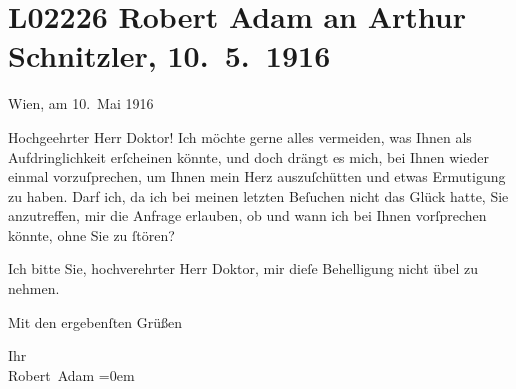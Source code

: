 

\section[Robert Adam an Arthur Schnitzler, 10. 5. 1916]{L02226 Robert Adam an Arthur Schnitzler, 10. 5. 1916}
\nopagebreak{}
\rehead{ }\normalsize\beginnumbering{}
\toendnotes[C]{\smallbreak\pagebreak[2]}
\pstart
           \raggedleft{}{\pb}Wien, am 10. Mai 1916\pend
           
\pstart{}Hochgeehrter Herr Doktor!\pend\vspace{0.5em}
\pstart
           Ich möchte gerne alles vermeiden, was Ihnen als Aufdringlichkeit erſcheinen könnte,
               und doch drängt es mich, bei Ihnen wieder einmal vorzuſprechen, um Ihnen mein Herz
               auszuſchütten und etwas Ermutigung zu haben. Darf ich, da ich bei meinen letzten
               Beſuchen nicht das Glück hatte, Sie anzutreffen, mir die Anfrage erlauben, ob und
               wann ich bei Ihnen vor{\pb}ſprechen könnte, ohne Sie zu
               ſtören?\pend
           
\pstart
           Ich bitte Sie, hochverehrter Herr Doktor, mir dieſe Behelligung nicht übel zu
               nehmen.\pend
           
\pstart
           Mit den ergebenſten Grüßen\pend
           
\pstart
           Ihr{\\[\baselineskip]}\spacefill\mbox{Robert Adam}\pend
           \leftskip=0em{}\endnumbering{}  
      